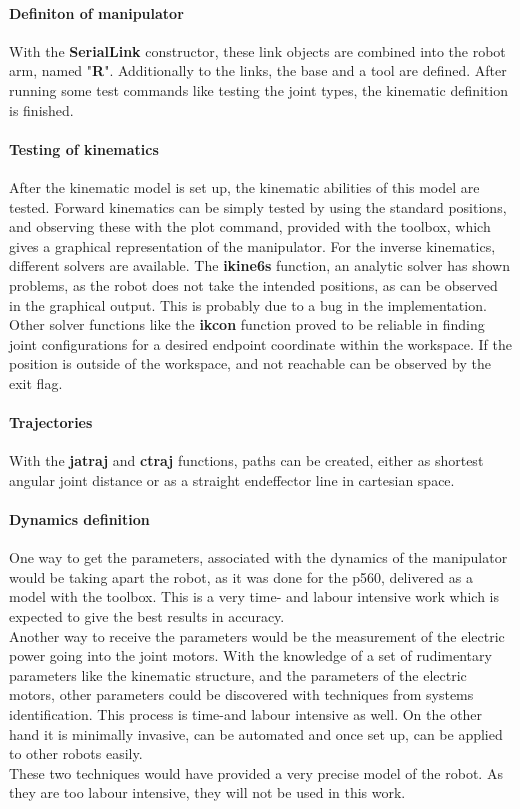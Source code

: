 \paragraph{Definiton of manipulator }
With the \textbf{SerialLink} constructor, these link objects are combined into the robot arm, named "\textbf{R}". 
Additionally to the links, the base and a tool are defined. After running some test commands like testing the joint types, the kinematic definition is finished.

\paragraph{Testing of kinematics}
After the kinematic model is set up, the kinematic abilities of this model are tested. 
Forward kinematics can be simply tested by using the standard positions, and observing these with the plot command, provided with the toolbox, which gives a graphical representation of the manipulator.
For the inverse kinematics, different solvers are available. The \textbf{ikine6s} function, an analytic solver has shown problems, as the robot does not take the intended positions, as can be observed in the graphical output. This is probably due to a bug in the implementation.
Other solver functions like the \textbf{ikcon} function proved to be reliable in finding joint configurations for a desired endpoint coordinate within the workspace. If the position is outside of the workspace, and not reachable can be observed by the exit flag.

\paragraph{Trajectories}
With the \textbf{jatraj} and \textbf{ctraj} functions, paths can be created, either as shortest angular joint distance or as a straight endeffector line in cartesian space.

\paragraph{Dynamics definition}
One way to get the parameters, associated with the dynamics of the manipulator would be taking apart the robot, as it was done for the p560, delivered as a model with the toolbox.
This is a very time- and labour intensive work which is expected to give the best results in accuracy.\\
Another way to receive the parameters would be the measurement of the electric power going into the joint motors. With the knowledge of a set of rudimentary parameters like the kinematic structure, and the parameters of the electric motors, other parameters could be discovered with techniques from systems identification. This process is time-and labour intensive as well. On the other hand it is minimally invasive, can be automated and once set up, can be applied to other robots easily.\\
These two techniques would have provided a very precise model of the robot. As they are too labour intensive, they will not be used in this work.\\

